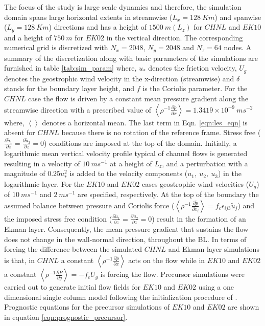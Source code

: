 \documentclass{amsart}
\begin{document}
The focus of the study is large scale dynamics and therefore, the simulation domain spans large horizontal extents in streamwise ($L_{x}=128\ Km$) and spanwise ($L_{y}=128\ Km$) directions and has a height of $1500\ m (L_z)$ for $CHNL$ and $EK10$ and a height of $750\ m$ for $EK02$ in the vertical direction. The corresponding numerical grid is discretized with $N_{x}= 2048$, $N_{y}=2048$ and $N_{z}=64$ nodes. A summary of the discretization along with basic parameters of the simulations are furnished in table \ref{tab:sim_param} where, $u_*$ denotes the friction velocity, $U_g$ denotes the geostrophic wind velocity in the x-direction (streamwise) and $\delta$ stands for the boundary layer height, and $f$ is the Coriolis parameter.
For the $CHNL$ case the flow is driven by a constant mean pressure gradient along the streamwise direction with a prescribed value of $\left < \rho^{-1} \frac{\partial \tilde{p}}{\partial x} \right > = 1.3419\times 10^{-9}\ ms^{-2}$ where, $\left <  \right >$ denotes a horizontal mean. The last term in Eqn. \ref{eqn:les_eqn} is absent for $CHNL$ because there is no rotation of the reference frame. Stress free ($\frac{\partial \tilde{u}_1}{\partial z}=\frac{\partial \tilde{u}_2}{\partial z}=0$) conditions are imposed at the top of the domain. Initially, a logarithmic mean vertical velocity profile typical of channel flows is generated resulting in a velocity of $10\ ms^{-1}$ at a height of $L_z$, and a perturbation with a magnitude of  $0.25 u_*^{2}$ is added to the velocity components ($u_1,\ u_2,\ u_3$) in the logarithmic layer. For the $EK10$ and $EK02$ cases geostrophic wind velocities ($U_{g}$) of $10\ ms^{-1}$ and $2\ ms^{-1}$ are specified, respectively. At the top of the boundary the assumed balance between pressure and Coriolis force ($\left < \rho^{-1}\frac{\partial \tilde{p} }{\partial x_i} \right > = f_c\epsilon_{ij3}\tilde{u}_j$) and the imposed stress free condition ($\frac{\partial \tilde{u}_1}{\partial z}=\frac{\partial \tilde{u}_2}{\partial z}=0$) result in the formation of an Ekman layer. Consequently,  the mean pressure gradient that sustains the flow does not change in the wall-normal direction, throughout the BL.  In terms of forcing the difference between the simulated $CHNL$ and Ekman layer simulations is that, in $CHNL$ a constant $\left < \rho^{-1} \frac{\partial \tilde{p}}{\partial x} \right >$ acts on the flow while in $EK10$ and $EK02$ a constant $\left < \rho^{-1}\frac{\partial P }{\partial y} \right >  = -f_c U_g$ is forcing the flow. Precursor simulations were carried out to generate initial flow fields for $EK10$ and $EK02$ using a one dimensional single column model following the initialization procedure of \citet{andren_brown_qjrm_94}. Prognostic equations for the precursor simulations of $EK10$ and $EK02$ are shown in equation \ref{eqn:prognostic_precursor}.
\end{document}
